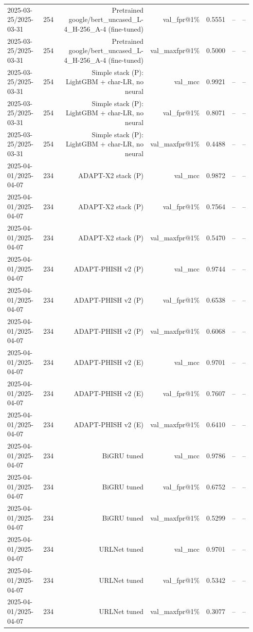 \begin{table}[t]
\begin{tabular}{llrrrrr}
2025-03-25/2025-03-31 & 254 & Pretrained google/bert\_uncased\_L-4\_H-256\_A-4 (fine-tuned) & val\_fpr@1\% & 0.5551 & -- & -- \\
2025-03-25/2025-03-31 & 254 & Pretrained google/bert\_uncased\_L-4\_H-256\_A-4 (fine-tuned) & val\_maxfpr@1\% & 0.5000 & -- & -- \\
2025-03-25/2025-03-31 & 254 & Simple stack (P): LightGBM + char-LR, no neural & val\_mcc & 0.9921 & -- & -- \\
2025-03-25/2025-03-31 & 254 & Simple stack (P): LightGBM + char-LR, no neural & val\_fpr@1\% & 0.8071 & -- & -- \\
2025-03-25/2025-03-31 & 254 & Simple stack (P): LightGBM + char-LR, no neural & val\_maxfpr@1\% & 0.4488 & -- & -- \\
2025-04-01/2025-04-07 & 234 & ADAPT-X2 stack (P) & val\_mcc & 0.9872 & -- & -- \\
2025-04-01/2025-04-07 & 234 & ADAPT-X2 stack (P) & val\_fpr@1\% & 0.7564 & -- & -- \\
2025-04-01/2025-04-07 & 234 & ADAPT-X2 stack (P) & val\_maxfpr@1\% & 0.5470 & -- & -- \\
2025-04-01/2025-04-07 & 234 & ADAPT-PHISH v2 (P) & val\_mcc & 0.9744 & -- & -- \\
2025-04-01/2025-04-07 & 234 & ADAPT-PHISH v2 (P) & val\_fpr@1\% & 0.6538 & -- & -- \\
2025-04-01/2025-04-07 & 234 & ADAPT-PHISH v2 (P) & val\_maxfpr@1\% & 0.6068 & -- & -- \\
2025-04-01/2025-04-07 & 234 & ADAPT-PHISH v2 (E) & val\_mcc & 0.9701 & -- & -- \\
2025-04-01/2025-04-07 & 234 & ADAPT-PHISH v2 (E) & val\_fpr@1\% & 0.7607 & -- & -- \\
2025-04-01/2025-04-07 & 234 & ADAPT-PHISH v2 (E) & val\_maxfpr@1\% & 0.6410 & -- & -- \\
2025-04-01/2025-04-07 & 234 & BiGRU tuned & val\_mcc & 0.9786 & -- & -- \\
2025-04-01/2025-04-07 & 234 & BiGRU tuned & val\_fpr@1\% & 0.6752 & -- & -- \\
2025-04-01/2025-04-07 & 234 & BiGRU tuned & val\_maxfpr@1\% & 0.5299 & -- & -- \\
2025-04-01/2025-04-07 & 234 & URLNet tuned & val\_mcc & 0.9701 & -- & -- \\
2025-04-01/2025-04-07 & 234 & URLNet tuned & val\_fpr@1\% & 0.5342 & -- & -- \\
2025-04-01/2025-04-07 & 234 & URLNet tuned & val\_maxfpr@1\% & 0.3077 & -- & -- \\

\end{tabular}
\end{table}
